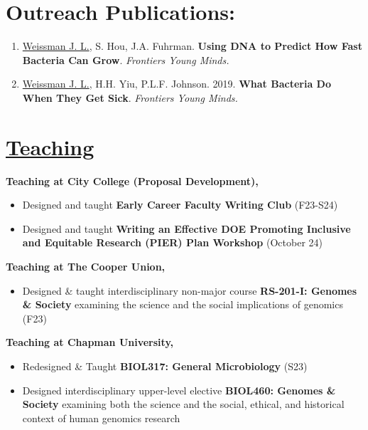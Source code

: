 \documentclass[]{res}
\begin{document}
\begin{resume}
\begin{enumerate}[leftmargin=*]
\end{enumerate} 
 

 
\section{Outreach Publications:} \vspace{0mm}

 \begin{enumerate}[leftmargin=*]

\item \underline{Weissman J. L.}, S. Hou, J.A. Fuhrman. {\bf Using DNA to Predict How Fast Bacteria Can Grow}. \emph{Frontiers Young Minds.}

\item \underline{Weissman J. L.}, H.H. Yiu, P.L.F. Johnson. 2019. {\bf What Bacteria Do When They Get Sick}. \emph{Frontiers Young Minds.}

  \end{enumerate} 


\section{\underline{Teaching}} \vspace{2mm}

{\bf Teaching at City College (Proposal Development),} 
\begin{itemize} \itemsep -2pt
\item Designed and taught {\bf Early Career Faculty Writing Club} (F23-S24)
\item Designed and taught {\bf Writing an Effective DOE Promoting Inclusive and Equitable Research (PIER) Plan Workshop} (October 24)
\end{itemize}


{\bf Teaching at The Cooper Union,} 
\begin{itemize} \itemsep -2pt
\item Designed \& taught interdisciplinary non-major course {\bf RS-201-I: Genomes \& Society} examining the science and the social implications of genomics (F23)
\end{itemize}

{\bf Teaching at Chapman University,} 
\begin{itemize} \itemsep -2pt
\item Redesigned \& Taught {\bf BIOL317: General Microbiology} (S23)
\item Designed interdisciplinary upper-level elective {\bf BIOL460: Genomes \& Society} examining both the science and the social, ethical, and historical context of human genomics research
\end{itemize}


\end{resume}
\end{document}
